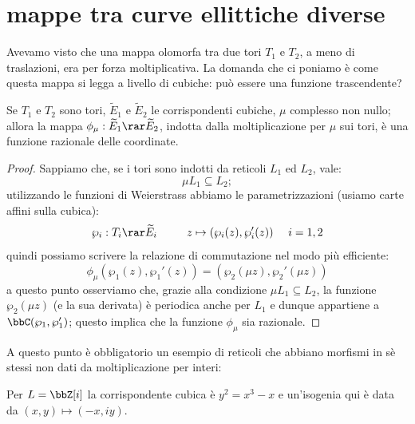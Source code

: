 \section{mappe tra curve ellittiche diverse}
Avevamo visto che una mappa olomorfa tra due tori $T_1$ e $T_2$, a meno di traslazioni, era per forza moltiplicativa. La domanda che ci poniamo è come questa mappa si legga a livello di cubiche: può essere una funzione trascendente?
\begin{proposizione}
Se $T_1$ e $T_2$ sono tori, $\widetilde{E}_1$ e $\widetilde{E}_2$ le corrispondenti cubiche, $\mu$ complesso non nullo; allora la mappa $\phi_\mu:\widetilde{E}_1\rar\widetilde{E}_2$, indotta dalla moltiplicazione per $\mu$ sui tori, è una funzione razionale delle coordinate.
\end{proposizione}
\begin{proof}
Sappiamo che, se i tori sono indotti da reticoli $L_1$ ed $L_2$, vale:
$$
\mu L_1\subseteq L_2;
$$
utilizzando le funzioni di Weierstrass abbiamo le parametrizzazioni (usiamo carte affini sulla cubica):
$$
\wp_i:T_i\rar \widetilde{E}_i \qquad \ \ z \mapsto (\wp_i(z),\wp_i'(z))\ \ \ \ i=1,2
$$
quindi possiamo scrivere la relazione di commutazione nel modo più efficiente:
$$
\phi_\mu(\wp_1(z),\wp_1'(z))=(\wp_2(\mu z),\wp_2'(\mu z))
$$
a questo punto osserviamo che, grazie alla condizione $\mu L_1\subseteq L_2$, la funzione $\wp_2(\mu z)$ (e la sua derivata) è periodica anche per $L_1$ e dunque appartiene a $\bbC(\wp_1,\wp_1')$; questo implica che la funzione $\phi_\mu$ sia razionale.
\end{proof}
A questo punto è obbligatorio un esempio di reticoli che abbiano morfismi in sè stessi non dati da moltiplicazione per interi:
\begin{fatto}
Per $L=\bbZ[i]$ la corrispondente cubica è $y^2=x^3-x$ e un'isogenia qui è data da $(x,y)\mapsto (-x,iy)$.
\end{fatto}
